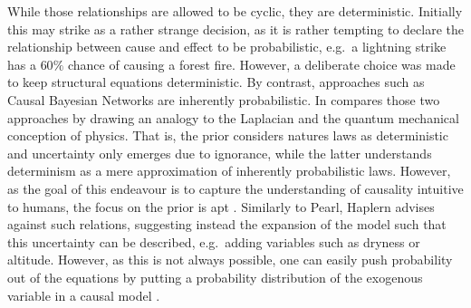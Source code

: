 \documentclass[11pt,a4paper]{book}
\theoremstyle{definition}
\theoremstyle{definition}
\theoremstyle{definition}
\theoremstyle{remark}
\begin{document}
While those relationships are allowed to be cyclic, they are deterministic. Initially this may strike as a rather strange decision, as  it is rather tempting to declare the relationship between cause and effect to be probabilistic, e.g.\ a lightning strike has a $60\%$ chance of causing a forest fire. However, a deliberate choice was made to keep structural equations deterministic.
By contrast, approaches such as Causal Bayesian Networks are inherently probabilistic. In  \parencite{pearl2009causality} compares those two approaches by drawing an analogy to the Laplacian and the quantum mechanical conception of physics. That is, the prior considers natures laws as deterministic and uncertainty only emerges due to ignorance, while the latter understands determinism as a mere approximation of inherently probabilistic laws.
However, as the goal of this endeavour is to capture the understanding of causality intuitive to humans, the focus on the prior is apt \parencite{pearl2009causality}. 
Similarly to Pearl, Haplern advises against such relations, suggesting instead the expansion of the model such that this uncertainty can be described, e.g.\ adding variables such as dryness or altitude. 
However, as this is not always possible, one can easily push probability out of the equations by putting a probability distribution of the exogenous variable in a causal model \parencite[p.~13]{halpern2015cause,halpern2016actual}.
\end{document}
